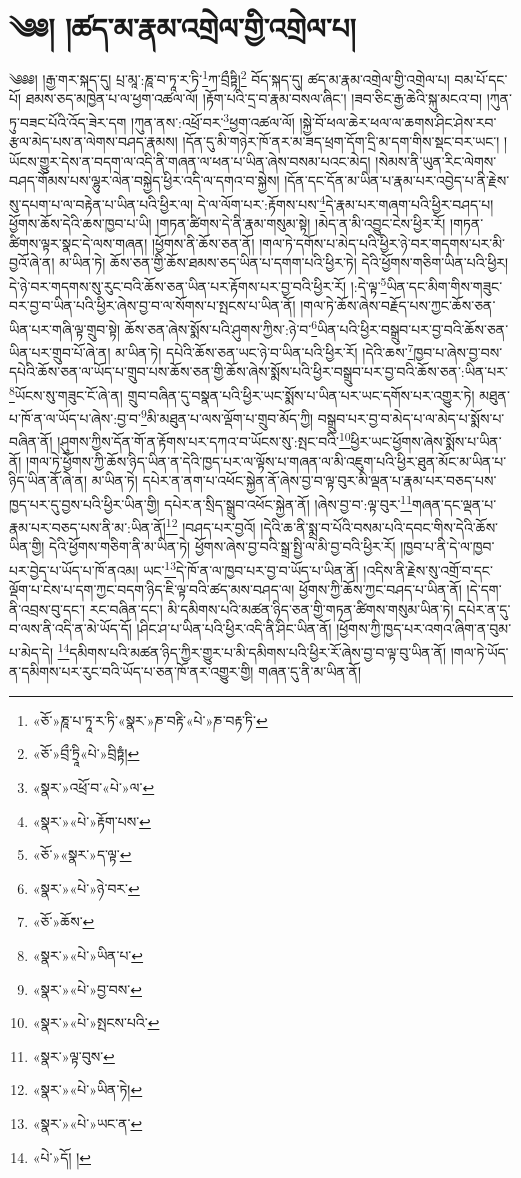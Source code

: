 \chapter{༄༅། །ཚད་མ་རྣམ་འགྲེལ་གྱི་འགྲེལ་པ།}༄༅༅། །རྒྱ་གར་སྐད་དུ། པྲ་མཱ་:ཎཱ་བ་ཏཱ་ར་ཏི་\footnote{«ཅོ་»ཎཱ་པ་ཏཱ་ར་ཏི་«སྣར་»ཎ་བརྟི་«པེ་»ཎ་བརྟ་ཏི་}ཀ་བྲྀཏྟི།\footnote{«ཅོ་»བྲྀ་ཏྲཱི«པེ་»བྲིཏྟཾ།} བོད་སྐད་དུ། ཚད་མ་རྣམ་འགྲེལ་གྱི་འགྲེལ་པ། བམ་པོ་དང་པོ། ཐམས་ཅད་མཁྱེན་པ་ལ་ཕྱག་འཚལ་ལོ། །རྟོག་པའི་དྲ་བ་རྣམ་བསལ་ཞིང་། །ཟབ་ཅིང་རྒྱ་ཆེའི་སྐུ་མངའ་བ། །ཀུན་ཏུ་བཟང་པོའི་འོད་ཟེར་དག །ཀུན་ནས་:འཕྲོ་བར་\footnote{«སྣར་»འཕྲོ་བ་«པེ་»ལ་}ཕྱག་འཚལ་ལོ། །སྐྱེ་བོ་ཕལ་ཆེར་ཕལ་ལ་ཆགས་ཤིང་ཤེས་རབ་རྩལ་མེད་པས་ན་ལེགས་བཤད་རྣམས། །དོན་དུ་མི་གཉེར་ཁོ་ནར་མ་ཟད་ཕྲག་དོག་དྲི་མ་དག་གིས་སྡང་བར་ཡང་། །ཡོངས་གྱུར་དེས་ན་བདག་ལ་འདི་ནི་གཞན་ལ་ཕན་པ་ཡིན་ཞེས་བསམ་པའང་མེད། །སེམས་ནི་ཡུན་རིང་ལེགས་བཤད་གོམས་པས་ལྷུར་ལེན་བསྐྱེད་ཕྱིར་འདི་ལ་དགའ་བ་སྐྱེས། །དོན་དང་དོན་མ་ཡིན་པ་རྣམ་པར་འབྱེད་པ་ནི་རྗེས་སུ་དཔག་པ་ལ་བརྟེན་པ་ཡིན་པའི་ཕྱིར་ལ། དེ་ལ་ལོག་པར་:རྟོགས་པས་\footnote{«སྣར་»«པེ་»རྟོག་པས་}དེ་རྣམ་པར་གཞག་པའི་ཕྱིར་བཤད་པ། ཕྱོགས་ཆོས་དེའི་ཆས་ཁྱབ་པ་ཡི། །གཏན་ཚིགས་དེ་ནི་རྣམ་གསུམ་སྟེ། །མེད་ན་མི་འབྱུང་ངེས་ཕྱིར་རོ། །གཏན་ཚིགས་ལྟར་སྣང་དེ་ལས་གཞན། །ཕྱོགས་ནི་ཆོས་ཅན་ནོ། །གལ་ཏེ་དགོས་པ་མེད་པའི་ཕྱིར་ཉེ་བར་གདགས་པར་མི་བྱའོ་ཞེ་ན། མ་ཡིན་ཏེ། ཆོས་ཅན་གྱི་ཆོས་ཐམས་ཅད་ཡིན་པ་དགག་པའི་ཕྱིར་ཏེ། དེའི་ཕྱོགས་གཅིག་ཡིན་པའི་ཕྱིར། དེ་ཉེ་བར་གདགས་སུ་རུང་བའི་ཆོས་ཅན་ཡིན་པར་རྟོགས་པར་བྱ་བའི་ཕྱིར་རོ། །:དེ་ལྟ་\footnote{«ཅོ་»«སྣར་»ད་ལྟ་}ཡིན་དང་མིག་གིས་གཟུང་བར་བྱ་བ་ཡིན་པའི་ཕྱིར་ཞེས་བྱ་བ་ལ་སོགས་པ་སྤངས་པ་ཡིན་ནོ། །གལ་ཏེ་ཆོས་ཞེས་བརྗོད་པས་ཀྱང་ཆོས་ཅན་ཡིན་པར་གཞི་ལྟ་གྲུབ་སྟེ། ཆོས་ཅན་ཞེས་སྨོས་པའི་ཤུགས་ཀྱིས་:ཉེ་བ་\footnote{«སྣར་»«པེ་»ཉེ་བར་}ཡིན་པའི་ཕྱིར་བསྒྲུབ་པར་བྱ་བའི་ཆོས་ཅན་ཡིན་པར་གྲུབ་པོ་ཞེ་ན། མ་ཡིན་ཏེ། དཔེའི་ཆོས་ཅན་ཡང་ཉེ་བ་ཡིན་པའི་ཕྱིར་རོ། །དེའི་ཆས་\footnote{«ཅོ་»ཆོས་}ཁྱབ་པ་ཞེས་བྱ་བས་དཔེའི་ཆོས་ཅན་ལ་ཡོད་པ་གྲུབ་པས་ཆོས་ཅན་གྱི་ཆོས་ཞེས་སྨོས་པའི་ཕྱིར་བསྒྲུབ་པར་བྱ་བའི་ཆོས་ཅན་:ཡིན་པར་\footnote{«སྣར་»«པེ་»ཡིན་པ་}ཡོངས་སུ་གཟུང་ངོ་ཞེ་ན། གྲུབ་བཞིན་དུ་བསྣན་པའི་ཕྱིར་ཡང་སྨོས་པ་ཡིན་པར་ཡང་དགོས་པར་འགྱུར་ཏེ། མཐུན་པ་ཁོ་ན་ལ་ཡོད་པ་ཞེས་:བྱ་བ་\footnote{«སྣར་»«པེ་»བྱ་བས་}མི་མཐུན་པ་ལས་ལྡོག་པ་གྲུབ་མོད་ཀྱི། བསྒྲུབ་པར་བྱ་བ་མེད་པ་ལ་མེད་པ་སྨོས་པ་བཞིན་ནོ། །ཤུགས་ཀྱིས་དོན་གོ་ན་རྟོགས་པར་དཀའ་བ་ཡོངས་སུ་:སྤང་བའི་\footnote{«སྣར་»«པེ་»སྤངས་པའི་}ཕྱིར་ཡང་ཕྱོགས་ཞེས་སྨོས་པ་ཡིན་ནོ། །གལ་ཏེ་ཕྱོགས་ཀྱི་ཆོས་ཉིད་ཡིན་ན་དེའི་ཁྱད་པར་ལ་ལྟོས་པ་གཞན་ལ་མི་འཇུག་པའི་ཕྱིར་ཐུན་མོང་མ་ཡིན་པ་ཉིད་ཡིན་ནོ་ཞེ་ན། མ་ཡིན་ཏེ། དཔེར་ན་ནག་པ་འཕོང་སྐྱེན་ནོ་ཞེས་བྱ་བ་ལྟ་བུར་མི་ལྡན་པ་རྣམ་པར་བཅད་པས་ཁྱད་པར་དུ་བྱས་པའི་ཕྱིར་ཡིན་གྱི། དཔེར་ན་སྲིད་སྒྲུབ་འཕོང་སྐྱེན་ནོ། །ཞེས་བྱ་བ་:ལྟ་བུར་\footnote{«སྣར་»ལྟ་བུས་}གཞན་དང་ལྡན་པ་རྣམ་པར་བཅད་པས་ནི་མ་:ཡིན་ནོ།\footnote{«སྣར་»«པེ་»ཡིན་ཏེ།} །བཤད་པར་བྱའོ། །དེའི་ཆ་ནི་སྨྲ་བ་པོའི་བསམ་པའི་དབང་གིས་དེའི་ཆོས་ཡིན་གྱི། དེའི་ཕྱོགས་གཅིག་ནི་མ་ཡིན་ཏེ། ཕྱོགས་ཞེས་བྱ་བའི་སྒྲ་སྤྱི་ལ་མི་བྱ་བའི་ཕྱིར་རོ། །ཁྱབ་པ་ནི་དེ་ལ་ཁྱབ་པར་བྱེད་པ་ཡོད་པ་ཁོ་ནའམ། ཡང་\footnote{«སྣར་»«པེ་»ཡང་ན་}དེ་ཁོ་ན་ལ་ཁྱབ་པར་བྱ་བ་ཡོད་པ་ཡིན་ནོ། །འདིས་ནི་རྗེས་སུ་འགྲོ་བ་དང་ལྡོག་པ་ངེས་པ་དག་ཀྱང་བདག་ཉིད་ཇི་ལྟ་བའི་ཚད་མས་བཤད་ལ། ཕྱོགས་ཀྱི་ཆོས་ཀྱང་བཤད་པ་ཡིན་ནོ། །དེ་དག་ནི་འབྲས་བུ་དང་། རང་བཞིན་དང་། མི་དམིགས་པའི་མཚན་ཉིད་ཅན་གྱི་གཏན་ཚིགས་གསུམ་ཡིན་ཏེ། དཔེར་ན་དུ་བ་ལས་ནི་འདི་ན་མེ་ཡོད་དོ། །ཤིང་ཤ་པ་ཡིན་པའི་ཕྱིར་འདི་ནི་ཤིང་ཡིན་ནོ། །ཕྱོགས་ཀྱི་ཁྱད་པར་འགའ་ཞིག་ན་བུམ་པ་མེད་དེ། \footnote{«པེ་»དོ། ། }དམིགས་པའི་མཚན་ཉིད་ཀྱིར་གྱུར་པ་མི་དམིགས་པའི་ཕྱིར་རོ་ཞེས་བྱ་བ་ལྟ་བུ་ཡིན་ནོ། །གལ་ཏེ་ཡོད་ན་དམིགས་པར་རུང་བའི་ཡོད་པ་ཅན་ཁོ་ནར་འགྱུར་གྱི། གཞན་དུ་ནི་མ་ཡིན་ནོ། 